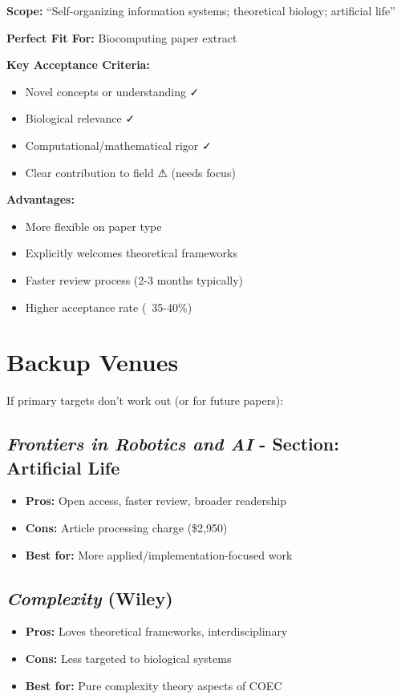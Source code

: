 \documentclass[11pt]{article}
\begin{document}
\textbf{Scope:} ``Self-organizing information systems; theoretical biology; artificial life''

\textbf{Perfect Fit For:} Biocomputing paper extract

\textbf{Key Acceptance Criteria:}
\begin{itemize}[leftmargin=*]
    \item Novel concepts or understanding ✓
    \item Biological relevance ✓
    \item Computational/mathematical rigor ✓
    \item Clear contribution to field ⚠ (needs focus)
\end{itemize}

\textbf{Advantages:}
\begin{itemize}[leftmargin=*]
    \item More flexible on paper type
    \item Explicitly welcomes theoretical frameworks
    \item Faster review process (2-3 months typically)
    \item Higher acceptance rate (~35-40\%)
\end{itemize}

\section{Backup Venues}

If primary targets don't work out (or for future papers):

\subsection{\textit{Frontiers in Robotics and AI} - Section: Artificial Life}
\begin{itemize}[leftmargin=*]
    \item \textbf{Pros:} Open access, faster review, broader readership
    \item \textbf{Cons:} Article processing charge (\$2,950)
    \item \textbf{Best for:} More applied/implementation-focused work
\end{itemize}

\subsection{\textit{Complexity} (Wiley)}
\begin{itemize}[leftmargin=*]
    \item \textbf{Pros:} Loves theoretical frameworks, interdisciplinary
    \item \textbf{Cons:} Less targeted to biological systems
    \item \textbf{Best for:} Pure complexity theory aspects of COEC
\end{itemize}
\end{document}
